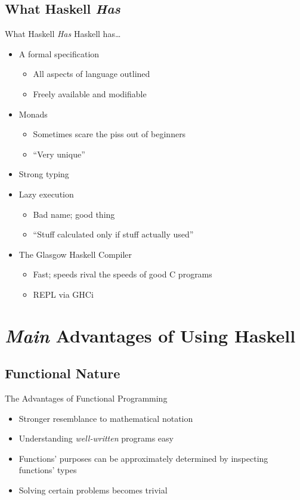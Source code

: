 \documentclass{beamer}
\begin{document}
		\subsection{What Haskell \textit{Has}}
			\begin{frame}{What Haskell \textit{Has}}
				Haskell has\dots
				\begin{itemize}
					\item A formal specification
					\begin{itemize}
						\item All aspects of language outlined
						\item Freely available and modifiable
					\end{itemize}
					\item Monads
					\begin{itemize}
						\item Sometimes scare the piss out of beginners
						\item ``Very unique''
					\end{itemize}
					\item Strong typing
					\item Lazy execution
					\begin{itemize}
						\item Bad name; good thing
						\item ``Stuff calculated only if stuff actually used''
					\end{itemize}
					\item The Glasgow Haskell Compiler
					\begin{itemize}
						\item Fast; speeds rival the speeds of
							good C programs
						\item REPL via GHCi
					\end{itemize}
				\end{itemize}
			\end{frame}
			\section{\textit{Main} Advantages of Using Haskell}
		\subsection{Functional Nature}
			\begin{frame}{The Advantages of Functional Programming}
				\begin{itemize}
					\item Stronger resemblance to mathematical notation
					\item Understanding \textit{well-written} programs easy
					\item Functions' purposes can be approximately determined
						by inspecting functions' types
					\item Solving certain problems becomes trivial
				\end{itemize}
			\end{frame}
\end{document}
